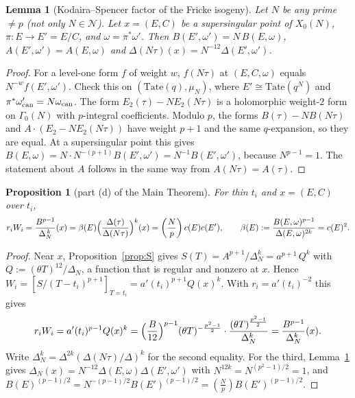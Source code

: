\documentclass[11pt,a4paper]{article}
\numberwithin{equation}{section}
\newtheorem{proposition}[theorem]{Proposition}
\newtheorem{lemma}[theorem]{Lemma}
\theoremstyle{definition}
\theoremstyle{remark}
\newcommand{\Lp}[1]{\left(\frac{#1}{p}\right)}
\begin{document}
\begin{lemma}[Kodaira--Spencer factor of the Fricke isogeny]\label{lem:Bisog}
Let $N$ be any prime $\ne p$ (not only $N\in\mathcal N$). Let $x=(E,C)$ be a supersingular point of
$X_0(N)$, $\pi:E\to E'=E/C$, and $\omega=\pi^*\omega'$. Then
$B(E',\omega')=N\,B(E,\omega)$, $A(E',\omega')=A(E,\omega)$ and
$\Delta(N\tau)(x)=N^{-12}\Delta(E',\omega')$.
\end{lemma}
\begin{proof}
For a level-one form $f$ of weight $w$, $f(N\tau)$ at $(E,C,\omega)$ equals $N^{-w}f(E',\omega')$. Check
this on $(\mathrm{Tate}(q),\mu_N)$, where $E'\cong\mathrm{Tate}(q^N)$ and
$\pi^*\omega_{\rm can}'=N\omega_{\rm can}$. The form $E_2(\tau)-NE_2(N\tau)$ is a holomorphic
weight-$2$ form on $\Gamma_0(N)$ with $p$-integral coefficients. Modulo $p$, the forms
$B(\tau)-NB(N\tau)$ and $A\cdot(E_2-NE_2(N\tau))$ have weight $p+1$ and the same $q$-expansion, so they
are equal. At a supersingular point this gives $B(E,\omega)=N\cdot N^{-(p+1)}B(E',\omega')=N^{-1}B(E',\omega')$,
because $N^{p-1}=1$. The statement about $A$ follows in the same way from $A(N\tau)=A(\tau)$.
\end{proof}

\begin{proposition}[part (d) of the Main Theorem]\label{prop:product}
For thin $t_i$ and $x=(E,C)$ over $t_i$,
\[
r_iW_i=\frac{B^{p-1}}{\Delta_N^{\,k}}(x)=\beta(E)\Bigl(\frac{\Delta(\tau)}{\Delta(N\tau)}\Bigr)^{k}(x)
=\Lp{N}c(E)c(E'),\qquad \beta(E):=\frac{B(E,\omega)^{p-1}}{\Delta(E,\omega)^{2k}}=c(E)^2.
\]
\end{proposition}
\begin{proof}
Near $x$, Proposition~\ref{prop:S} gives $S(T)=A^{p+1}/\Delta_N^k=a^{p+1}\,Q^{k}$ with
$Q:=(\theta T)^{12}/\Delta_N$, a function that is regular and nonzero at $x$. Hence
$W_i=[S/(T-t_i)^{p+1}]_{T=t_i}=a'(t_i)^{p+1}Q(x)^k$. With $r_i=a'(t_i)^{-2}$ this gives
\[
r_iW_i=a'(t_i)^{p-1}Q(x)^k=\Bigl(\frac{B}{12}\Bigr)^{p-1}(\theta T)^{-\frac{p^2-1}2}\cdot
\frac{(\theta T)^{\frac{p^2-1}{2}}}{\Delta_N^{k}}=\frac{B^{p-1}}{\Delta_N^k}(x).
\]
Write $\Delta_N^k=\Delta^{2k}(\Delta(N\tau)/\Delta)^k$ for the second equality. For the third,
Lemma~\ref{lem:Bisog} gives $\Delta_N(x)=N^{-12}\Delta(E,\omega)\Delta(E',\omega')$ with
$N^{12k}=N^{(p^2-1)/2}=1$, and $B(E)^{(p-1)/2}=N^{-(p-1)/2}B(E')^{(p-1)/2}=\Lp NB(E')^{(p-1)/2}$.
\end{proof}

\end{document}
